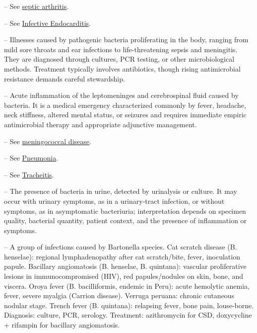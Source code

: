 -- See \hyperlink{Septic Arthritis}{septic arthritis}.

-- See \hyperlink{Infective Endocarditis}{Infective Endocarditis}.

-- Illnesses caused by pathogenic bacteria proliferating in the body, ranging from mild sore throats and ear infections to life-threatening sepsis and meningitis. They are diagnosed through cultures, PCR testing, or other microbiological methods. Treatment typically involves antibiotics, though rising antimicrobial resistance demands careful stewardship.

-- Acute inflammation of the leptomeninges and cerebrospinal fluid caused by bacteria. It is a medical emergency characterized commonly by fever, headache, neck stiffness, altered mental status, or seizures and requires immediate empiric antimicrobial therapy and appropriate adjunctive management.

-- See \hyperlink{Meningococcal Disease}{meningococcal disease}.

-- See \hyperlink{Pneumonia}{Pneumonia}.

-- See \hyperlink{Tracheitis}{Tracheitis}.

-- The presence of bacteria in urine, detected by urinalysis or culture. It may occur with urinary symptoms, as in a urinary-tract infection, or without symptoms, as in asymptomatic bacteriuria; interpretation depends on specimen quality, bacterial quantity, patient context, and the presence of inflammation or symptoms.

-- A group of infections caused by Bartonella species. Cat scratch disease (B. henselae): regional lymphadenopathy after cat scratch/bite, fever, inoculation papule. Bacillary angiomatosis (B. henselae, B. quintana): vascular proliferative lesions in immunocompromised (HIV), red papules/nodules on skin, bone, and viscera. Oroya fever (B. bacilliformis, endemic in Peru): acute hemolytic anemia, fever, severe myalgia (Carrion disease). Verruga peruana: chronic cutaneous nodular stage. Trench fever (B. quintana): relapsing fever, bone pain, louse-borne. Diagnosis: culture, PCR, serology. Treatment: azithromycin for CSD, doxycycline + rifampin for bacillary angiomatosis.

